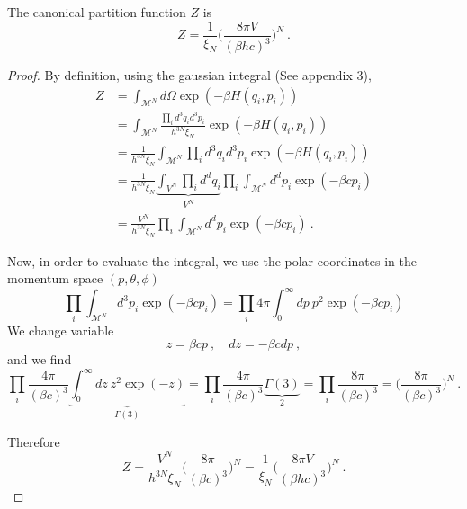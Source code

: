     The canonical partition function $Z$ is 
    \begin{equation*}
        Z = \frac{1}{\xi_N} \Big (\frac{8\pi V}{(\beta h c)^3} \Big )^N ~.
    \end{equation*}
    \begin{proof}
        By definition, using the gaussian integral (See appendix 3),
        \begin{equation*}
        \begin{aligned}
            Z & = \int_{\mathcal M^N} d\Omega \exp(- \beta H (q_i, p_i)) \\ & = \int_{\mathcal M^N} \frac{\prod_i d^3 q_i d^3 p_i}{h^{3N} \xi_N} \exp(- \beta H (q_i, p_i)) \\ & = \frac{1}{h^{3N} \xi_N} \int_{\mathcal M^N} \prod_i d^3 q_i d^3 p_i \exp(- \beta H (q_i, p_i)) \\ & = \frac{1}{h^{3N} \xi_N} \underbrace{\int_{ V^N} \prod_i d^d q_i}_{V^N} \prod_i \int_{\mathcal M^N} d^d p_i \exp(- \beta c p_i) \\ & = \frac{V^N}{h^{3N} \xi_N} \prod_i \int_{\mathcal M^N} d^d p_i \exp(- \beta c p_i) ~.
        \end{aligned}
        \end{equation*}

        Now, in order to evaluate the integral, we use the polar coordinates in the momentum space $(p, \theta, \phi)$
        \begin{equation*}
            \prod_i \int_{\mathcal M^N} d^3 p_i \exp(- \beta c p_i) = \prod_i 4 \pi \int_0^\infty dp ~ p^2 \exp(- \beta c p_i)
        \end{equation*}
        We change variable 
        \begin{equation*}
            z = \beta c p ~, \quad dz = - \beta c dp ~,
        \end{equation*}
        and we find 
        \begin{equation*}
            \prod_i \frac{4\pi}{(\beta c)^3} \underbrace{\int_0^\infty dz ~ z^2 \exp(- z)}_{\Gamma (3)} = \prod_i \frac{4\pi}{(\beta c)^3} \underbrace{\Gamma (3)}_2 = \prod_i \frac{8\pi}{(\beta c)^3} = \Big (\frac{8\pi}{(\beta c)^3} \Big )^N ~.
        \end{equation*}

        Therefore 
        \begin{equation*}
            Z = \frac{V^N}{h^{3N} \xi_N} \Big (\frac{8\pi}{(\beta c)^3} \Big )^N = \frac{1}{\xi_N} \Big (\frac{8\pi V}{(\beta h c)^3} \Big )^N ~.
        \end{equation*}
    \end{proof}

